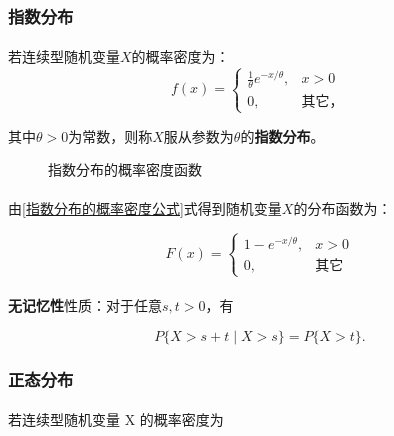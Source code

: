 \subsubsection{指数分布}
\paragraph{}
若连续型随机变量$X$的概率密度为：
\begin{equation}
  \label{指数分布的概率密度公式}
  f(x) = \left\{ \begin{array}{ll}
    \frac{1}{\theta}e^{-x/\theta}, & x > 0 \\ 0, & \text{其它，}
  \end{array} \right.
\end{equation}

其中$\theta > 0$为常数，则称$X$服从参数为$\theta$的\textbf{指数分布}。

\begin{figure}[H]
  \centering
    
    \caption{指数分布的概率密度函数}
    \label{指数分布的概率密度函数}
\end{figure}

\paragraph{}
由\eqref{指数分布的概率密度公式}式得到随机变量$X$的分布函数为：

\begin{equation}
  F(x) = \left\{ \begin{array}{ll}
    1 - e^{-x/\theta}, & x > 0 \\ 0, & \text{其它}
  \end{array} \right.
\end{equation}

\paragraph{}
\textbf{无记忆性}性质：对于任意$s,t>0$，有

\begin{equation}
  P\{X > s + t \;|\; X > s\} = P\{X > t\}.
\end{equation}

\subsubsection{正态分布}
\paragraph{}
若连续型随机变量 X 的概率密度为

